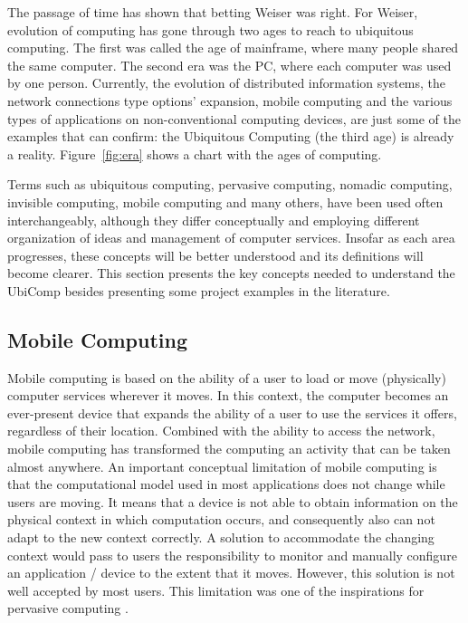 \documentclass{acm_proc_article-sp}
\begin{document}
The passage of time has shown that betting Weiser was right. For Weiser, \cite{weiser1997coming} evolution of computing has gone through two ages to reach to ubiquitous computing. The first was called the age of mainframe, where many people shared the same computer. The second era was the PC, where each computer was used by one person. Currently, the evolution of distributed information systems, the network connections type options'  expansion, mobile computing and the various types of applications on non-conventional computing devices, are just some of the examples that can confirm: the Ubiquitous Computing (the third age) is already a reality. Figure~\ref{fig:era} shows a chart with the ages of computing.
\newline
\newline

Terms such as ubiquitous computing, pervasive computing, nomadic computing, invisible computing, mobile computing and many others, have been used often interchangeably, although they differ conceptually and employing different organization of ideas and management of computer services. Insofar as each area progresses, these concepts will be better understood and its definitions will become clearer. This section presents the key concepts needed to understand the UbiComp besides presenting some project examples in the literature.

\subsection{Mobile Computing}
Mobile computing is based on the ability of a user to load or move (physically) computer services wherever it moves. In this context, the computer becomes an ever-present device that expands the ability of a user to use the services it offers, regardless of their location. Combined with the ability to access the network, mobile computing has transformed the computing an activity that can be taken almost anywhere.
\newline
\newline
An important conceptual limitation of mobile computing is that the computational model used in most applications does not change while users are moving. It means that a device is not able to obtain information on the physical context in which computation occurs, and consequently also can not adapt to the new context correctly. A solution to accommodate the changing context would pass to users the responsibility to monitor and manually configure an application / device to the extent that it moves. However, this solution is not well accepted by most users. This limitation was one of the inspirations for pervasive computing .
\end{document}
